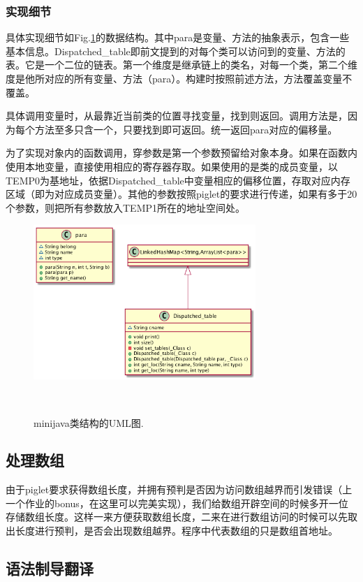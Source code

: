 \documentclass[10pt,a4paper]{article}
\begin{document}
\subsubsection{实现细节}

具体实现细节如Fig.\ref{fig:umlb}的数据结构。其中para是变量、方法的抽象表示，包含一些基本信息。Dispatched\_table即前文提到的对每个类可以访问到的变量、方法的表。它是一个二位的链表。第一个维度是继承链上的类名，对每一个类，第二个维度是他所对应的所有变量、方法（para）。构建时按照前述方法，方法覆盖变量不覆盖。

具体调用变量时，从最靠近当前类的位置寻找变量，找到则返回。调用方法是，因为每个方法至多只含一个，只要找到即可返回。统一返回para对应的偏移量。

为了实现对象内的函数调用，穿参数是第一个参数预留给对象本身。如果在函数内使用本地变量，直接使用相应的寄存器存取。如果使用的是类的成员变量，以TEMP0为基地址，依据Dispatched\_table中变量相应的偏移位置，存取对应内存区域（即为对应成员变量）。其他的参数按照piglet的要求进行传递，如果有多于20个参数，则把所有参数放入TEMP1所在的地址空间处。

\begin{figure}[t!]
\centering
  \includegraphics[width=0.75\textwidth]{uml2.png}
  \caption{minijava类结构的UML图.}~\label{fig:umlb}
\end{figure}
\subsection{处理数组}

由于piglet要求获得数组长度，并拥有预判是否因为访问数组越界而引发错误（上一个作业的bonus，在这里可以完美实现），我们给数组开辟空间的时候多开一位存储数组长度。这样一来方便获取数组长度，二来在进行数组访问的时候可以先取出长度进行预判，是否会出现数组越界。程序中代表数组的只是数组首地址。

\subsection{语法制导翻译}
\end{document}
